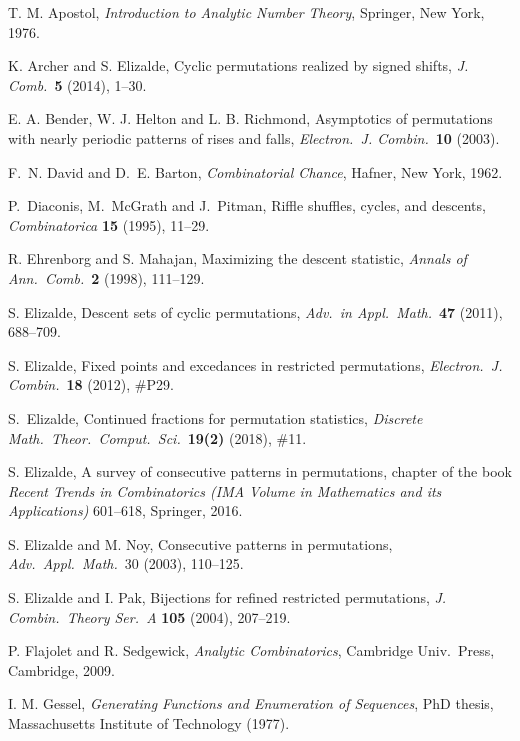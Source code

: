 \documentclass[12pt]{article}
\theoremstyle{definition}
\begin{document}
\begin{thebibliography}{}

 T. M. Apostol, {\it Introduction to Analytic Number Theory}, Springer, New York, 1976. 

 K. Archer and S. Elizalde, Cyclic permutations realized by signed shifts, {\it J. Comb.}\ \textbf{5} (2014), 1--30. 

 E. A. Bender, W. J. Helton and L. B. Richmond, Asymptotics of permutations with nearly periodic patterns of rises and falls, {\it Electron.\ J. Combin.}\ \textbf{10} (2003).

 F.~N. David and D.~E. Barton, \textit{Combinatorial Chance}, Hafner, New York, 1962.

 P.~Diaconis, M.~McGrath and J.~Pitman, Riffle shuffles, cycles, and descents, \textit{Combinatorica} \textbf{15} (1995), 11--29. 

 R. Ehrenborg and S. Mahajan, Maximizing the descent statistic, {\it Annals of Ann.\ Comb.}\ \textbf{2} (1998), 111--129. 

 S. Elizalde, Descent sets of cyclic permutations, {\it Adv.\ in Appl.\ Math.}\ \textbf{47} (2011), 688--709. 

 S. Elizalde, Fixed points and excedances in restricted permutations, {\it  Electron.\ J. Combin.}\ \textbf{18} (2012), \#P29.

 S.~Elizalde, Continued fractions for permutation statistics, {\it Discrete Math.\ Theor.\ Comput.\ Sci.}\ \textbf{19(2)} (2018), \#11.

 S. Elizalde, {A survey of consecutive patterns in permutations}, chapter of the book {\it Recent Trends in Combinatorics (IMA Volume in Mathematics and its Applications)} 601--618, Springer, 2016.

 S. Elizalde and M. Noy, Consecutive patterns in permutations, {\it Adv.\ Appl.\ Math.}\ 30 (2003), 110--125.

 S. Elizalde and I. Pak, Bijections for refined restricted permutations, {\it J. Combin.\ Theory Ser.\ A} \textbf{105} (2004), 207--219.


 P. Flajolet and R. Sedgewick, {\it Analytic Combinatorics}, Cambridge Univ.\ Press, Cambridge, 2009.

 I. M. Gessel, \textit{Generating Functions and Enumeration of Sequences}, PhD thesis, Massachusetts Institute of Technology (1977).


\end{thebibliography}
\end{document}
